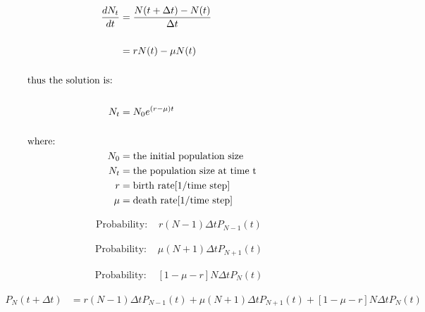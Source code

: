 \documentclass[12pt]{article}
\begin{document}
\begin{align}
\dfrac{dN_{t}}{dt} & = \frac{N(t+ \Delta t) - N(t)}{\Delta t} \nonumber \\
\nonumber \\
& = r N(t)-\mu N(t) \nonumber \\
\nonumber \\ 
&    \hspace{-1.3in}  \text{thus the solution is:} \nonumber \\
\nonumber \\ 
N_{t} & = N_{0}e^{\left( r - \mu \right)t} \nonumber \\
\nonumber \\ 
&    \hspace{-1.3in}  \text{where:} \nonumber \\
N_{0} & = \text{the initial population size} \nonumber \\
N_{t} & = \text{the population size at time t} \nonumber \\
r & = \text{birth rate[1/time step]} \nonumber \\
\mu & = \text{death rate[1/time step]} \nonumber
\end{align} 


\begin{align}
\text{Probability: } & r (N-1) \Delta t P_{N-1}(t)  \nonumber
\end{align} 

\begin{align}
\text{Probability: } & \mu (N+1) \Delta t P_{N+1}(t)  \nonumber
\end{align} 

\begin{align}
\text{Probability: } & \left[ 1- \mu - r \right]N \Delta tP_{N}(t) \nonumber
\end{align} 

\begin{align}
P_{N}(t+ \Delta t) & = r (N-1) \Delta t P_{N-1}(t) + \mu (N+1) \Delta t P_{N+1}(t)+ \left[ 1- \mu - r \right]N \Delta tP_{N}(t) \nonumber
\end{align} 
\end{document}
